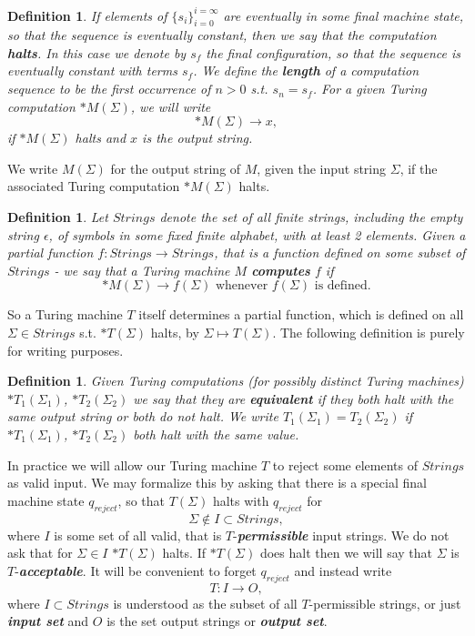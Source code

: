 \documentclass{amsart}  %
\numberwithin{equation}{section}
\newtheorem{definition}[equation]{Definition}
\theoremstyle{definition}
\theoremstyle{remark}
\begin{document}
{\begin{definition}
If elements of $\{s _{i} \} _{i=0} ^{i=\infty}$ are eventually in some final machine state, so that the sequence is eventually constant, then we say that the computation \textbf{\emph{halts}}.  In this case we denote by $s _{f} $ the final configuration, so that the sequence is eventually constant with terms $s _{f} $. We define the \textbf{\emph{length}} of a computation sequence to be the first occurrence of $n>0$ s.t. $s _{n}=s _{f}  $.
For a given Turing computation $* M (\Sigma)$, we will write \begin{equation*}
   * M (\Sigma) \to x, 
   \end{equation*}
if $* M (\Sigma)$ halts and $x$  is the output string. 
\end{definition}
We write $M (\Sigma)$ for the output string of $M$, given the input string $\Sigma$, if the associated Turing computation $*M (\Sigma)$  halts. 

\begin{definition} Let $Strings$ denote the set of all finite strings, including the empty string $\epsilon$, of symbols in some fixed finite alphabet, with at least 2 elements.
Given a partial function $f: Strings \to Strings$, that is a function defined on some subset of $Strings$ - we say that a Turing machine $M$ \textbf{\emph{computes}} $f$ if  $$*M (\Sigma) \to f (\Sigma) \text{ whenever $f (\Sigma)$ is defined}.
   $$ \end{definition}

 So a Turing machine $T$ itself determines a partial function, which is defined on all $\Sigma \in Strings$ s.t. $*T (\Sigma)$ halts, by $\Sigma \mapsto T (\Sigma)$.  
The following definition is purely for writing purposes.
\begin{definition} \label{def:equivalent} Given Turing computations (for possibly distinct Turing machines) $*T _{1} (\Sigma _{1} ) $, $* T _{2} (\Sigma _{2} ) $ we say that they are \textbf{\emph{equivalent}} if they both halt with the same output string or both do not halt. We write $T _{1} (\Sigma _{1} )  = T _{2} (\Sigma _{2} ) $ if $*T _{1} (\Sigma _{1} ) $, $* T _{2} (\Sigma _{2} ) $ both halt with the same value.
\end{definition} 
In practice we will allow our Turing machine $T$ to reject some elements of $Strings$ as valid input. We may formalize this by asking that there is a special final machine state $q _{reject} $, so that $T (\Sigma)$ halts with $q _{reject} $ for $$\Sigma \notin {I} \subset Strings,$$ where ${I}$ is some set of all valid, that is $T$-\textbf{\emph{permissible}} input strings.  We do not ask that for $\Sigma \in I$ $*T (\Sigma)$ halts. If $*T (\Sigma)$ does halt then we will say that $\Sigma$ is $T$-\textbf{\emph{acceptable}}.
It will be convenient to forget $q _{reject} $ and instead write $$T: {I} \to O,$$ where ${I} \subset Strings$ is understood as the subset of all $T$-permissible strings, or just \textbf{\emph{input set}} and $O$ is the set output strings or \textbf{\emph{output set}}.

}
\end{document}
